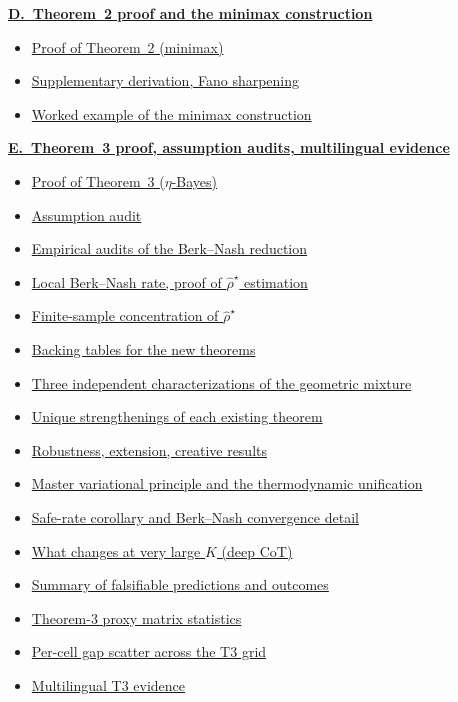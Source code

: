 \begin{tcolorbox}
{\textbf{\hyperref[app:letter-D]{D.\ Theorem~2 proof and the minimax construction}}
\begin{itemize}
  \item \hyperref[app:thm2]{Proof of Theorem~2 (minimax)}
  \item \hyperref[app:fano-sharpening]{Supplementary derivation, Fano sharpening}
  \item \hyperref[app:worked-minimax]{Worked example of the minimax construction}
\end{itemize}

\textbf{\hyperref[app:letter-E]{E.\ Theorem~3 proof, assumption audits, multilingual evidence}}
\begin{itemize}
  \item \hyperref[app:thm3]{Proof of Theorem~3 ($\eta$-Bayes)}
  \item \hyperref[app:assumption-audit]{Assumption audit}
  \item \hyperref[app:t3-empirical-audits]{Empirical audits of the Berk--Nash reduction}
  \item \hyperref[app:berk-nash-rate]{Local Berk--Nash rate, proof of $\widehat\rho^\star$ estimation}
  \item \hyperref[app:rho-concentration]{Finite-sample concentration of $\widehat\rho^\star$}
  \item \hyperref[app:new-theorems-tables]{Backing tables for the new theorems}
  \item \hyperref[app:three-perspectives]{Three independent characterizations of the geometric mixture}
  \item \hyperref[app:strengthenings]{Unique strengthenings of each existing theorem}
  \item \hyperref[app:robustness-extension]{Robustness, extension, creative results}
  \item \hyperref[app:master-free-energy]{Master variational principle and the thermodynamic unification}
  \item \hyperref[app:safe-rate-detail]{Safe-rate corollary and Berk--Nash convergence detail}
  \item \hyperref[app:large-k]{What changes at very large $K$ (deep CoT)}
  \item \hyperref[app:summary-predictions]{Summary of falsifiable predictions and outcomes}
  \item \hyperref[app:t3-proxy-stats]{Theorem-3 proxy matrix statistics}
  \item \hyperref[app:gap-scatter-fig]{Per-cell gap scatter across the T3 grid}
  \item \hyperref[app:multilingual]{Multilingual T3 evidence}
\end{itemize}

}
\end{tcolorbox}
